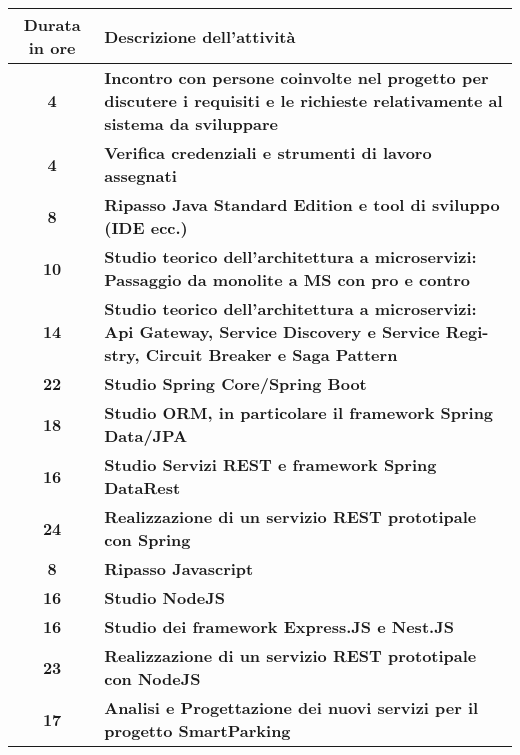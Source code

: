 

\begin{tabularx}{\textwidth}{|c|X|}
	\hline
	\textbf{Durata in ore} & \textbf{Descrizione dell'attività} \\\hline

	\textbf{4} & \textbf{Incontro con persone coinvolte nel progetto per discutere i requisiti e le richieste relativamente
    al sistema da sviluppare} \\	 
    \hline
    \textbf{4} & \textbf{Verifica credenziali e strumenti di lavoro assegnati} \\	 
    \hline
    \textbf{8} & \textbf{Ripasso Java Standard Edition e tool di sviluppo (IDE ecc.)} \\	 
    \hline
    \textbf{10} & \textbf{Studio teorico dell’architettura a microservizi: Passaggio da monolite a MS con pro e contro} \\	 
    \hline
    \textbf{14} & \textbf{Studio teorico dell’architettura a microservizi: Api Gateway, Service Discovery e Service Regi-
    stry, Circuit Breaker e Saga Pattern} \\ 
    \hline
    \hline

    \textbf{22} & \textbf{Studio Spring Core/Spring Boot} \\	 
    \hline
    \textbf{18} & \textbf{Studio ORM, in particolare il framework Spring Data/JPA} \\ 
    \hline
    \hline

    \textbf{16} & \textbf{Studio Servizi REST e framework Spring DataRest} \\	 
    \hline
    \textbf{24} & \textbf{Realizzazione di un servizio REST prototipale con Spring} \\ 
    \hline
    \hline

    \textbf{8} & \textbf{Ripasso Javascript} \\	 
    \hline
    \textbf{16} & \textbf{Studio NodeJS} \\
    \hline
    \textbf{16} & \textbf{Studio dei framework Express.JS e Nest.JS} \\
    \hline
    \hline

    \textbf{23} & \textbf{Realizzazione di un servizio REST prototipale con NodeJS} \\	 
    \hline
    \textbf{17} & \textbf{Analisi e Progettazione dei nuovi servizi per il progetto SmartParking} \\
    \hline
    \hline


\end{tabularx}
